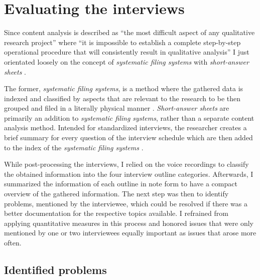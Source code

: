 \section{Evaluating the interviews}

Since content analysis is described as \enquote{the most difficult aspect of any qualitative research project} where \enquote{it is impossible to establish a complete step-by-step operational procedure that will consistently result in qualitative analysis} \cite[p. 102]{berg01} I just orientated loosely on the concept of \textit{systematic filing systems} \cite[p. 103]{berg01} with \textit{short-answer sheets} \cite[p. 105]{berg01}.

The former, \textit{systematic filing systems}, is a method where the gathered data is indexed and classified by aspects that are relevant to the research to be then grouped and filed in a literally physical manner \cite[p. 103]{berg01}. \textit{Short-answer sheets} are primarily an addition to \textit{systematic filing systems}, rather than a separate content analysis method. Intended for standardized interviews, the researcher creates a brief summary for every question of the interview schedule which are then added to the index of the \textit{systematic filing systems} \cite[p. 105]{berg01}.

While post-processing the interviews, I relied on the voice recordings to classify the obtained information into the four interview outline categories. Afterwards, I summarized the information of each outline in note form to have a compact overview of the gathered information. The next step was then to identify problems, mentioned by the interviewee, which could be resolved if there was a better documentation for the respective topics available. I refrained from applying quantitative measures in this process and honored issues that were only mentioned by one or two interviewees equally important as issues that arose more often.

\subsection{Identified problems}

